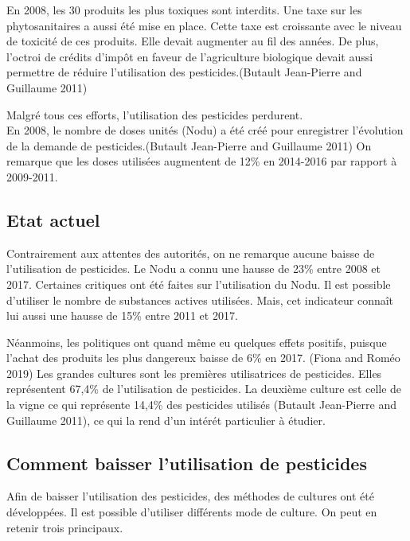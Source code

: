 \documentclass[11pt,]{article}
\begin{document}
En 2008, les 30 produits les plus toxiques sont interdits. Une taxe sur
les phytosanitaires a aussi été mise en place. Cette taxe est croissante
avec le niveau de toxicité de ces produits. Elle devait augmenter au fil
des années. De plus, l'octroi de crédits d'impôt en faveur de
l'agriculture biologique devait aussi permettre de réduire l'utilisation
des pesticides.(Butault Jean-Pierre and Guillaume 2011)

Malgré tous ces efforts, l'utilisation des pesticides perdurent.\\
En 2008, le nombre de doses unités (Nodu) a été créé pour enregistrer
l'évolution de la demande de pesticides.(Butault Jean-Pierre and
Guillaume 2011) On remarque que les doses utilisées augmentent de 12\%
en 2014-2016 par rapport à 2009-2011.

\hypertarget{etat-actuel}{%
\subsection{Etat actuel}\label{etat-actuel}}

Contrairement aux attentes des autorités, on ne remarque aucune baisse
de l'utilisation de pesticides. Le Nodu a connu une hausse de 23\% entre
2008 et 2017. Certaines critiques ont été faites sur l'utilisation du
Nodu. Il est possible d'utiliser le nombre de substances actives
utilisées. Mais, cet indicateur connaît lui aussi une hausse de 15\%
entre 2011 et 2017.

Néanmoins, les politiques ont quand même eu quelques effets positifs,
puisque l'achat des produits les plus dangereux baisse de 6\% en 2017.
(Fiona and Roméo 2019) Les grandes cultures sont les premières
utilisatrices de pesticides. Elles représentent 67,4\% de l'utilisation
de pesticides. La deuxième culture est celle de la vigne ce qui
représente 14,4\% des pesticides utilisés (Butault Jean-Pierre and
Guillaume 2011), ce qui la rend d'un intérét particulier à étudier.

\hypertarget{comment-baisser-lutilisation-de-pesticides}{%
\subsection{Comment baisser l'utilisation de
pesticides}\label{comment-baisser-lutilisation-de-pesticides}}

Afin de baisser l'utilisation des pesticides, des méthodes de cultures
ont été développées. Il est possible d'utiliser différents mode de
culture. On peut en retenir trois principaux.
\end{document}
